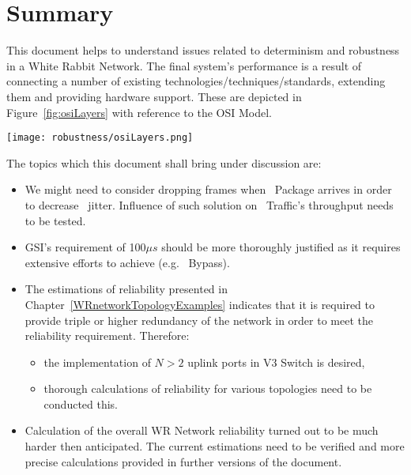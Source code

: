 \chapter{Summary}


This document helps to understand issues related to determinism and robustness
in a White Rabbit Network. The final system's performance is a result of
connecting a number of existing technologies/techniques/standards, extending
them and providing hardware support. These are depicted in
Figure~\ref{fig:osiLayers} with reference to the OSI Model. 


\begin{center}
	\texttt{[image: robustness/osiLayers.png]}
	\label{fig:osiLayers}
\end{center}

The topics which this document shall bring under discussion are:
\begin{itemize}
    \item We might need to consider dropping frames when \HP\ Package arrives in
order to decrease \ControlMessage\ jitter. Influence of such solution
on \SP\ Traffic's throughput needs to be tested.
    \item GSI's requirement of 100$\mu s$ should be more thoroughly justified as
it requires extensive efforts to achieve (e.g. \HP\ Bypass).
    \item The estimations of reliability presented in
Chapter~\ref{WRnetworkTopologyExamples} indicates that it is required to
provide triple or higher redundancy of the network in order to meet the
reliability requirement. Therefore:
   \begin{itemize}
      \item the implementation of $N > 2$ uplink ports in V3 Switch is desired,
      \item thorough calculations of reliability for various topologies need to
	    be conducted this.
   \end{itemize}
 \item Calculation of the overall WR Network
reliability turned out to be
much harder then anticipated. The current estimations need to be verified and
more precise calculations provided in further versions of the document.
\end{itemize}




